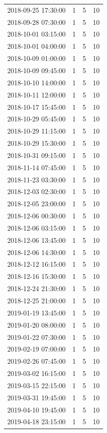 \begin{tabular}{lrrr}
2018-09-25 17:30:00 & 1 & 5 & 10 \\
2018-09-28 07:30:00 & 1 & 5 & 10 \\
2018-10-01 03:15:00 & 1 & 5 & 10 \\
2018-10-01 04:00:00 & 1 & 5 & 10 \\
2018-10-09 01:00:00 & 1 & 5 & 10 \\
2018-10-09 09:45:00 & 1 & 5 & 10 \\
2018-10-10 14:00:00 & 1 & 5 & 10 \\
2018-10-11 12:00:00 & 1 & 5 & 10 \\
2018-10-17 15:45:00 & 1 & 5 & 10 \\
2018-10-29 05:45:00 & 1 & 5 & 10 \\
2018-10-29 11:15:00 & 1 & 5 & 10 \\
2018-10-29 15:30:00 & 1 & 5 & 10 \\
2018-10-31 09:15:00 & 1 & 5 & 10 \\
2018-11-14 07:45:00 & 1 & 5 & 10 \\
2018-11-23 03:30:00 & 1 & 5 & 10 \\
2018-12-03 02:30:00 & 1 & 5 & 10 \\
2018-12-05 23:00:00 & 1 & 5 & 10 \\
2018-12-06 00:30:00 & 1 & 5 & 10 \\
2018-12-06 03:15:00 & 1 & 5 & 10 \\
2018-12-06 13:45:00 & 1 & 5 & 10 \\
2018-12-06 14:30:00 & 1 & 5 & 10 \\
2018-12-12 16:15:00 & 1 & 5 & 10 \\
2018-12-16 15:30:00 & 1 & 5 & 10 \\
2018-12-24 21:30:00 & 1 & 5 & 10 \\
2018-12-25 21:00:00 & 1 & 5 & 10 \\
2019-01-19 13:45:00 & 1 & 5 & 10 \\
2019-01-20 08:00:00 & 1 & 5 & 10 \\
2019-01-22 07:30:00 & 1 & 5 & 10 \\
2019-02-19 07:00:00 & 1 & 5 & 10 \\
2019-02-26 07:45:00 & 1 & 5 & 10 \\
2019-03-02 16:15:00 & 1 & 5 & 10 \\
2019-03-15 22:15:00 & 1 & 5 & 10 \\
2019-03-31 19:45:00 & 1 & 5 & 10 \\
2019-04-10 19:45:00 & 1 & 5 & 10 \\
2019-04-18 23:15:00 & 1 & 5 & 10 \\

\end{tabular}
